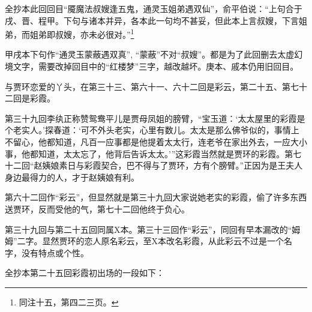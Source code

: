 \par 全抄本此回回目“魇魔法叔嫂逢五鬼，通灵玉姐弟遇双仙”，俞平伯说：“上句合于戌、晋、程甲。下句与诸本并异，各本此一句均不甚妥，但此本上言叔嫂，下言姐弟，而姐弟即叔嫂，亦未必很对。”\footnote{同注十五，第四二三页。}
\par 甲戌本下句作“通灵玉蒙蔽遇双真”, “蒙蔽”不对“叔嫂”。都是为了此回删去太虚幻境文字，需要改掉回目中的“红楼梦”三字，越改越坏。庚本、戚本仍用旧回目。
\par 与贾环恋爱的丫头，在第三十三、第六十一、六十二回是彩云，第二十五、第七十二回是彩霞。
\par 第三十九回李纨正称赞鸳鸯平儿是贾母凤姐的膀臂，“宝玉道：‘太太屋里的彩霞是个老实人。’探春道：‘可不外头老实，心里有数儿。太太是那么佛爷似的，事情上不留心，他都知道，凡百一应事都是他提着太太行，连老爷在家出外去，一应大小事，他都知道，太太忘了，他背后告诉太太。'”这彩霞当然就是贾环的彩霞。第七十二回“赵姨娘素日与彩霞契合，巴不得与了贾环，方有个膀臂。”正因为是王夫人身边最得力的人，才于赵姨娘有利。
\par 第六十二回作“彩云”，但显然就是第三十九回大家说她老实的彩霞，偷了许多东西送贾环，反而受他的气，第七十二回他终于负心。
\par 第三十九回与第二十五回同属X本。第三十三回作“彩云”，同回有早本漏改的“姆姆”二字。显然贾环的恋人原名彩云，至X本改名彩霞，从此彩云不过是一个名字，没有特点或个性。
\par 全抄本第二十五回彩霞初出场的一段如下：

